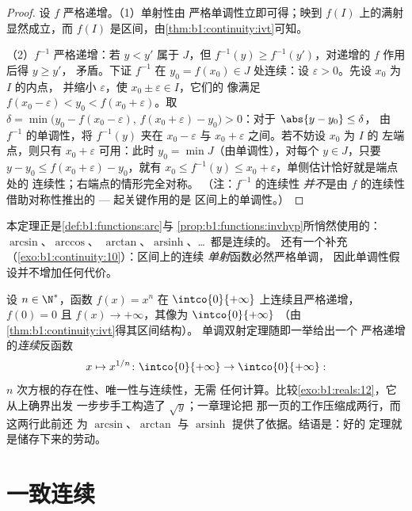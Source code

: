 \begin{proof}
设 $f$ 严格递增。（1）单射性由
严格单调性立即可得；映到 $f(I)$ 上的满射显然成立，而 $f(I)$
是区间，由\cref{thm:b1:continuity:ivt}可知。

（2）$f^{-1}$ 严格递增：若 $y < y'$ 属于 $J$，但 $f^{-1}(y)
\geq f^{-1}(y')$，对递增的 $f$ 作用后得 $y \geq y'$，
矛盾。下证 $f^{-1}$ 在 $y_0 = f(x_0) \in J$ 处连续：设
$\varepsilon > 0$。先设 $x_0$ 为 $I$ 的内点，
并缩小 $\varepsilon$，使 $x_0 \pm \varepsilon \in I$，它们的
像满足 $f(x_0 - \varepsilon) < y_0 < f(x_0 +
\varepsilon)$。取
$\delta = \min\bigl(y_0 - f(x_0 - \varepsilon),\, f(x_0 +
\varepsilon) - y_0\bigr) > 0$：对于 $\abs{y - y_0} \leq \delta$，
由 $f^{-1}$ 的单调性，将 $f^{-1}(y)$ 夹在 $x_0 -
\varepsilon$ 与 $x_0 + \varepsilon$ 之间。若不妨设 $x_0$ 为 $I$ 的
左端点，则只有 $x_0 + \varepsilon$ 可用：此时
$y_0 = \min J$（由单调性），对每个 $y \in J$，只要 $y - y_0
\leq f(x_0 + \varepsilon) - y_0$，就有 $x_0 \leq f^{-1}(y)
\leq x_0 + \varepsilon$，单侧估计恰好就是端点处的
连续性；右端点的情形完全对称。
（注：$f^{-1}$ 的连续性
\emph{并不}是由 $f$ 的连续性借助对称性推出的 --- 起关键作用的是
区间上的单调性。）
\end{proof}

\begin{remark}
本定理正是\cref{def:b1:functions:arc}与
\cref{prop:b1:functions:invhyp}所悄然使用的：$\arcsin$、$\arccos$、
$\arctan$、$\operatorname{arsinh}$、\dots\ 都是连续的。
还有一个补充（\cref{exo:b1:continuity:10}）：区间上的连续
\emph{单射}函数必然严格单调，
因此单调性假设并不增加任何代价。
\end{remark}

\begin{example}[各次方根]\label{ex:b1:continuity:nthroot}
设 $n \in \N^*$，函数 $f(x) = x^n$ 在
$\intco{0}{+\infty}$ 上连续且严格递增，$f(0) = 0$ 且
$f(x) \to +\infty$，其像为 $\intco{0}{+\infty}$
（由\cref{thm:b1:continuity:ivt}得其区间结构）。
单调双射定理随即一举给出一个
严格递增的\emph{连续}反函数
\[
x \mapsto x^{1/n} \colon \intco{0}{+\infty} \to
\intco{0}{+\infty} :
\]
$n$ 次方根的存在性、唯一性与连续性，无需
任何计算。比较\cref{exo:b1:reals:12}，它从上确界出发
一步步手工构造了 $\sqrt y$；一章理论把
那一页的工作压缩成两行，而这两行此前还
为 $\arcsin$、$\arctan$ 与
$\operatorname{arsinh}$ 提供了依据。结语是：好的
定理就是储存下来的劳动。
\end{example}

\section{一致连续}

